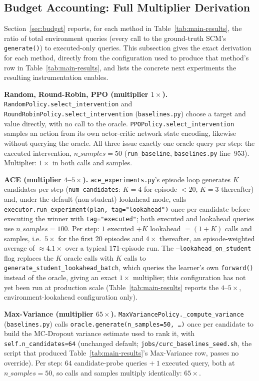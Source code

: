 \subsection{Budget Accounting: Full Multiplier Derivation}
\label{app:budget-extended}

Section~\ref{sec:budget} reports, for each method in Table~\ref{tab:main-results}, the ratio of total environment queries (every call to the ground-truth SCM's \texttt{generate()}) to executed-only queries. This subsection gives the exact derivation for each method, directly from the configuration used to produce that method's row in Table~\ref{tab:main-results}, and lists the concrete next experiments the resulting instrumentation enables.

\textbf{Random, Round-Robin, PPO (multiplier $1\times$).} \texttt{RandomPolicy.select\_intervention} and \texttt{RoundRobinPolicy.select\_intervention} (\texttt{baselines.py}) choose a target and value directly, with no call to the oracle. \texttt{PPOPolicy.select\_intervention} samples an action from its own actor-critic network state encoding, likewise without querying the oracle. All three issue exactly one oracle query per step: the executed intervention, $n\_samples=50$ (\texttt{run\_baseline}, \texttt{baselines.py} line~953). Multiplier: $1\times$ in both calls and samples.

\textbf{ACE (multiplier $4$--$5\times$).} \texttt{ace\_experiments.py}'s episode loop generates $K$ candidates per step (\texttt{num\_candidates}: $K{=}4$ for episode $<20$, $K{=}3$ thereafter) and, under the default (non-student) lookahead mode, calls \texttt{executor.run\_experiment(plan, tag="lookahead")} once per candidate before executing the winner with \texttt{tag="executed"}; both executed and lookahead queries use $n\_samples=100$. Per step: $1$ executed $+ K$ lookahead $= (1+K)$ calls and samples, i.e.\ $5\times$ for the first 20 episodes and $4\times$ thereafter, an episode-weighted average of $\approx\!4.1\times$ over a typical 171-episode run. The \texttt{--lookahead\_on\_student} flag replaces the $K$ oracle calls with $K$ calls to \texttt{generate\_student\_lookahead\_batch}, which queries the learner's own \texttt{forward()} instead of the oracle, giving an exact $1\times$ multiplier; this configuration has not yet been run at production scale (Table~\ref{tab:main-results} reports the $4$--$5\times$, environment-lookahead configuration only).

\textbf{Max-Variance (multiplier $65\times$).} \texttt{MaxVariancePolicy.\_compute\_variance} (\texttt{baselines.py}) calls \texttt{oracle.generate(n\_samples=50, \ldots)} once per candidate to build the MC-Dropout variance estimate used to rank it, with \texttt{self.n\_candidates=64} (unchanged default; \texttt{jobs/curc\_baselines\_seed.sh}, the script that produced Table~\ref{tab:main-results}'s Max-Variance row, passes no override). Per step: $64$ candidate-probe queries $+\ 1$ executed query, both at $n\_samples=50$, so calls and samples multiply identically: $65\times$.

